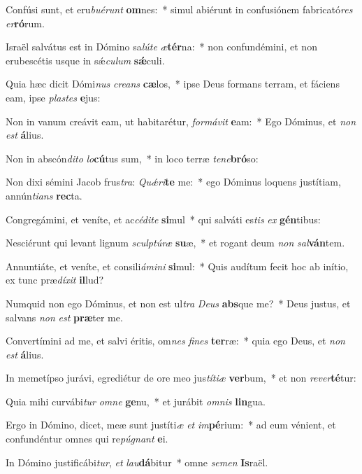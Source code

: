 \item Confúsi sunt, et eru\textit{bu}\textit{é}\textit{runt} \textbf{om}nes:~* simul abiérunt in confusiónem fabricató\textit{res} \textit{er}\textbf{ró}rum.
\item Israël salvátus est in Dómino sa\textit{lú}\textit{te} \textit{æ}\textbf{tér}na:~* non confundémini, et non erubescétis usque in sǽ\textit{cu}\textit{lum} \textbf{sǽ}culi.
\item Quia hæc dicit Dómi\textit{nus} \textit{cre}\textit{ans} \textbf{cæ}los,~* ipse Deus formans terram, et fáciens eam, ipse \textit{plas}\textit{tes} \textbf{e}jus:
\item Non in vanum creávit eam, ut habitarétur, \textit{for}\textit{má}\textit{vit} \textbf{e}am:~* Ego Dóminus, et \textit{non} \textit{est} \textbf{á}lius.
\item Non in abscón\textit{di}\textit{to} \textit{lo}\textbf{cú}tus sum,~* in loco terræ \textit{te}\textit{ne}\textbf{bró}so:
\item Non dixi sémini Jacob frus\textit{tra}: \textit{Quǽ}\textit{ri}\textbf{te} me:~* ego Dóminus loquens justítiam, annún\textit{ti}\textit{ans} \textbf{rec}ta.
\item Congregámini, et veníte, et ac\textit{cé}\textit{di}\textit{te} \textbf{si}mul~* qui salváti es\textit{tis} \textit{ex} \textbf{gén}tibus:
\item Nesciérunt qui levant lignum \textit{sculp}\textit{tú}\textit{ræ} \textbf{su}æ,~* et rogant deum \textit{non} \textit{sal}\textbf{ván}tem.
\item Annuntiáte, et veníte, et consili\textit{á}\textit{mi}\textit{ni} \textbf{si}mul:~* Quis audítum fecit hoc ab inítio, ex tunc præ\textit{dí}\textit{xit} \textbf{il}lud?
\item Numquid non ego Dóminus, et non est ul\textit{tra} \textit{De}\textit{us} \textbf{abs}que me?~* Deus justus, et salvans \textit{non} \textit{est} \textbf{præ}ter me.
\item Convertímini ad me, et salvi éritis, om\textit{nes} \textit{fi}\textit{nes} \textbf{ter}ræ:~* quia ego Deus, et \textit{non} \textit{est} \textbf{á}lius.
\item In memetípso jurávi, egrediétur de ore meo jus\textit{tí}\textit{ti}\textit{æ} \textbf{ver}bum,~* et non \textit{re}\textit{ver}\textbf{té}tur:
\item Quia mihi curvábi\textit{tur} \textit{om}\textit{ne} \textbf{ge}nu,~* et jurábit \textit{om}\textit{nis} \textbf{lin}gua.
\item Ergo in Dómino, dicet, meæ sunt justíti\textit{æ} \textit{et} \textit{im}\textbf{pé}rium:~* ad eum vénient, et confundéntur omnes qui re\textit{pú}\textit{gnant} \textbf{e}i.
\item In Dómino justificábi\textit{tur}, \textit{et} \textit{lau}\textbf{dá}bitur~* omne \textit{se}\textit{men} \textbf{Is}raël.
